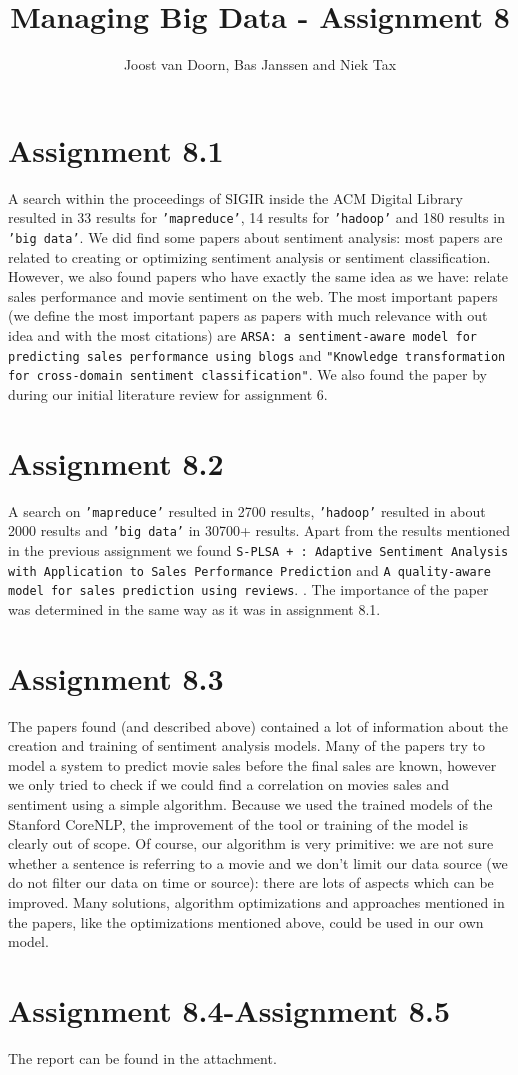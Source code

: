 \documentclass[]{article}
\title{Managing Big Data - Assignment 8}
\author{Joost van Doorn, Bas Janssen and Niek Tax}
\begin{document}
\maketitle

\section*{Assignment 8.1}
A search within the proceedings of SIGIR inside the ACM Digital Library resulted in 33 results for \texttt{'mapreduce'}, 14 results for \texttt{'hadoop'} and 180 results in \texttt{'big data'}. We did find some papers about sentiment analysis: most papers are related to creating or optimizing sentiment analysis or sentiment classification. However, we also found papers who have exactly the same idea as we have: relate sales performance and movie sentiment on the web. The most important papers (we define the most important papers as papers with much relevance with out idea and with the most citations) are \texttt{ARSA: a sentiment-aware model for predicting sales performance using blogs}\cite{Liu2007} and \texttt{"Knowledge transformation for cross-domain sentiment classification"}\cite{Li2009}. We also found the paper by \cite{Liu2007} during our initial literature review for assignment 6.

\section*{Assignment 8.2}
A search on \texttt{'mapreduce'} resulted in 2700 results, \texttt{'hadoop'} resulted in about 2000 results and \texttt{'big data'} in 30700+ results. Apart from the results mentioned in the previous assignment we found \texttt{S-PLSA + : Adaptive Sentiment Analysis with Application to Sales Performance Prediction}\cite{Liu} and \texttt{A quality-aware model for sales prediction using reviews}. \cite{Yu2010}. The importance of the paper was determined in the same way as it was in assignment 8.1.

\section*{Assignment 8.3}
The papers found (and described above) contained a lot of information about the creation and training of sentiment analysis models. Many of the papers try to model a system to predict movie sales before the final sales are known, however we only tried to check if we could find a correlation on movies sales and sentiment using a simple algorithm. Because we used the trained models of the Stanford CoreNLP, the improvement of the tool or training of the model is clearly out of scope. Of course, our algorithm is very primitive: we are not sure whether a sentence is referring to a movie and we don't limit our data source (we do not filter our data on time or source): there are lots of aspects which can be improved. Many solutions, algorithm optimizations and approaches mentioned in the papers, like the optimizations mentioned above, could be used in our own model.

\section*{Assignment 8.4-Assignment 8.5}
The report can be found in the attachment.





\end{document}
